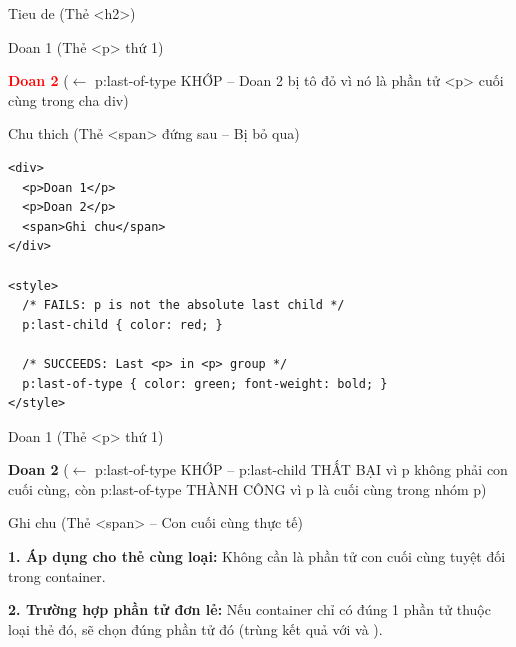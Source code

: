 \begin{browserWindow}
\sffamily\small
Tieu de {\scriptsize\textcolor{gray!60}{(Thẻ <h2>)}} \par\vspace{2pt}
Doan 1 {\scriptsize\textcolor{gray!60}{(Thẻ <p> thứ 1)}} \par\vspace{2pt}
\textcolor{red}{\textbf{Doan 2}} {\scriptsize\textcolor{gray!60}{($\leftarrow$ p:last-of-type KHỚP -- Doan 2 bị tô đỏ vì nó là phần tử <p> cuối cùng trong cha div)}} \par\vspace{2pt}
Chu thich {\scriptsize\textcolor{gray!60}{(Thẻ <span> đứng sau -- Bị bỏ qua)}}
\end{browserWindow}

\begin{codeWindow}
\begin{lstlisting}[language=HTML5]
<div>
  <p>Doan 1</p>
  <p>Doan 2</p>
  <span>Ghi chu</span>
</div>

<style>
  /* FAILS: p is not the absolute last child */
  p:last-child { color: red; }

  /* SUCCEEDS: Last <p> in <p> group */
  p:last-of-type { color: green; font-weight: bold; }
</style>
\end{lstlisting}
\end{codeWindow}

\begin{browserWindow}
\sffamily\small
Doan 1 {\scriptsize\textcolor{gray!60}{(Thẻ <p> thứ 1)}} \par\vspace{2pt}
\textcolor{green!70!black}{\textbf{Doan 2}} {\scriptsize\textcolor{gray!60}{($\leftarrow$ p:last-of-type KHỚP -- p:last-child THẤT BẠI vì p không phải con cuối cùng, còn p:last-of-type THÀNH CÔNG vì p là cuối cùng trong nhóm p)}} \par\vspace{2pt}
Ghi chu {\scriptsize\textcolor{gray!60}{(Thẻ <span> -- Con cuối cùng thực tế)}}
\end{browserWindow}

\begin{warnBox}
\textbf{1. Áp dụng cho thẻ cùng loại:} Không cần là phần tử con cuối cùng tuyệt đối trong container.
\par\vspace{4pt}
\textbf{2. Trường hợp phần tử đơn lẻ:} Nếu container chỉ có đúng 1 phần tử thuộc loại thẻ đó,  sẽ chọn đúng phần tử đó (trùng kết quả với  và ).
\end{warnBox}


